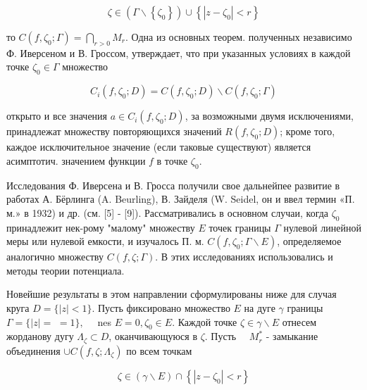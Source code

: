 \documentclass[10pt]{article}
\begin{document}
\[

\zeta \in\left(\Gamma \backslash\left\{\zeta_{0}\right\}\right) \cup\left\{\left|z-\zeta_{0}\right|<r\right\}

\]



то $C\left(f, \zeta_{0} ; \Gamma\right)=\bigcap_{r>0} M_{r}$. Одна из основных теорем. полученных независимо Ф. Иверсеном и В. Гроссом, утверждает, что при указанных условиях в каждой точке $\zeta_{0} \in \Gamma$ множество



\[

C_{i}\left(f, \zeta_{0} ; D\right)=C\left(f, \zeta_{0} ; D\right) \backslash C\left(f, \zeta_{0} ; \Gamma\right)

\]



открыто и все значения $a \in C_{i}\left(f, \zeta_{0} ; D\right)$, за возможными двумя исключениями, принадлежат множеству повторяющихся значений $R\left(f, \zeta_{0} ; D\right)$; кроме того, каждое исключительное значение (если таковые существуют) является асимптотич. значением функции $f$ в точке $\zeta_{0}$.



Исследования Ф. Иверсена и В. Гросса получили свое дальнейпее развитие в работах А. Бёрлинга (A. Beurling), В. Зайделя (W. Seidel, он и ввел термин «П. м.» в 1932) и др. (см. [5] - [9]). Рассматривались в основном случаи, когда $\zeta_{0}$ принадлежит нек-рому "малому" множеству $E$ точек границы $\Gamma$ нулевой линейной меры или нулевой емкости, и изучалось П. м. $C\left(f, \zeta_{0} ; \Gamma \backslash E\right)$, определяемое аналогично множеству $C(f, \zeta ; \Gamma)$. В этих исследованиях использовались и методы теории потенциала.



Новейшие результаты в этом направлении сформулированы ниже для случая круга $D=\{|z|<1\}$. Пусть фиксировано множество $E$ на дуге $\gamma$ границы $\Gamma=\{|z|=$ $=1\}, \quad$ nes $E=0, \zeta_{0} \in E$. Каждой точке $\zeta \in \gamma \backslash E$ отнесем жорданову дугу $\Lambda_{\zeta} \subset D$, оканчивающуюся в $\zeta$. Пусть $\quad M_{r}^{*}$ - замыкание объединения $\cup C\left(f, \zeta ; \Lambda_{\zeta}\right)$ по всем точкам



\[

\zeta \in(\gamma \backslash E) \cap\left\{\left|z-\zeta_{0}\right|<r\right\}

\]
\end{document}

